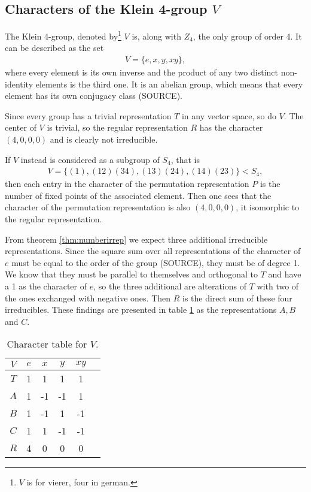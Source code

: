 \subsection{Characters of the Klein 4-group $V$}

The Klein 4-group, denoted by\footnote{$V$ is for vierer, four in german.} $V$ is, along with $Z_4$, the only group of order 4. It can be described as the set
\begin{align}
	V = \{ e, x, y, xy \},
\end{align}
where every element is its own inverse and the product of any two distinct non-identity elements is the third one.
It is an abelian group, which means that every element has its own conjugacy class (SOURCE).

Since every group has a trivial representation $T$ in any vector space, so do $V$. The center of $V$ is trivial, so the regular representation $R$ has the character $(4,0,0,0)$ and is clearly not irreducible.

If $V$ instead is considered as a subgroup of $S_4$, that is
\begin{align}
	V = \{ (1), (12)(34), (13)(24), (14)(23) \} < S_4,
\end{align}
then each entry in the character of the permutation representation $P$ is the number of fixed points of the associated element. Then one sees that the character of the permutation representation is also $(4,0,0,0)$, it isomorphic to the regular representation.

From theorem \ref{thm:numberirrep} we expect three additional irreducible representations. Since the square sum over all representations of the character of $e$ must be equal to the order of the group (SOURCE), they must be of degree 1. We know that they must be parallel to themselves and orthogonal to $T$ and have a 1 as the character of $e$, so the three additional are alterations of $T$ with two of the ones exchanged with negative ones. Then $R$ is the direct sum of these four irreducibles. These findings are presented in table \ref{table:charV} as the representations $A, B$ and $C$.


\begin{table}[hbt!]
	\centering
	\begin{tabular}{c | c c c c l}
		$V$ & $e$ & $x$ & $y$ & $xy$ &             \\ \hline
		$T$ & 1   & 1   & 1   & 1   &             \\
		$A$ & 1   & -1  & -1  & 1   &             \\
		$B$ & 1   & -1  & 1   & -1  &             \\
		$C$ & 1   & 1   & -1  & -1  &             \\ \hline\hline
		$R$ & 4   & 0   & 0   & 0   & %
	\end{tabular}
	\caption{Character table for $V$.}
	\label{table:charV}
\end{table}


